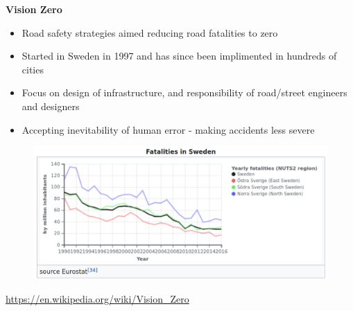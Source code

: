 \documentclass[aspectratio=169]{beamer}
\begin{document}
%
%
%
%	
%	
%	
%



\begin{frame}
	
	\textbf{Vision Zero}
	
	\vspace{2mm}
	
	\begin{itemize}
		\item Road safety strategies aimed reducing road fatalities to zero
		\item Started in Sweden in 1997 and has since been implimented in hundreds of cities
		\item Focus on design of infrastructure, and responsibility of road/street engineers and designers
		\item Accepting inevitability of human error - making accidents less severe
	\end{itemize}

	\begin{figure}
		\centering
		\includegraphics[width=0.75\linewidth]{images/sweden_road_fatalities.png}
		
	\end{figure}
	\tiny{\url{https://en.wikipedia.org/wiki/Vision_Zero}}


	
\end{frame}
\end{document}
